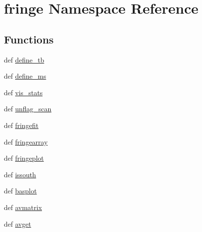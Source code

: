 \hypertarget{namespacefringe}{\section{fringe \-Namespace \-Reference}
\label{namespacefringe}
}
\subsection*{\-Functions}
\begin{DoxyCompactItemize}
\item 
def \hyperlink{namespacefringe_a606228b53d83d89f8b5fe29f5c11e08e}{define\-\_\-tb}
\item 
def \hyperlink{namespacefringe_a76e67dab65fbc81cb2a7f6491d349204}{define\-\_\-ms}
\item 
def \hyperlink{namespacefringe_a7b8a26d41af501f4082adaae8342fe36}{vis\-\_\-stats}
\item 
def \hyperlink{namespacefringe_ab6202ab719c67a1ebf62a7450caa4d94}{unflag\-\_\-scan}
\item 
def \hyperlink{namespacefringe_a625bc7e66cee8861021751a36aac78ae}{fringefit}
\item 
def \hyperlink{namespacefringe_ad41c1da665b9a038d2dccd352c431d57}{fringearray}
\item 
def \hyperlink{namespacefringe_a00275e862957e08ba0fa247e35b24c32}{fringeplot}
\item 
def \hyperlink{namespacefringe_a89c0462fcdbad389dd72d33431236299}{issouth}
\item 
def \hyperlink{namespacefringe_a74fb3f6a74f29b490bd589199ad62b7e}{basplot}
\item 
def \hyperlink{namespacefringe_a2533eb716e337d709b2fa1160b5ddeca}{avmatrix}
\item 
def \hyperlink{namespacefringe_a9581786772fb5cf44c880cc0a30380cf}{avget}
\end{DoxyCompactItemize}


